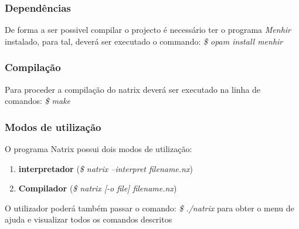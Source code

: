 \subsubsection{Dependências}
\label{sec2:subsubsec:dependencias}

De forma a ser possivel compilar o projecto é necessário ter o programa \textit{Menhir} instalado, para tal, deverá ser executado o commando: \textit{\$ opam install menhir}

\subsubsection{Compilação}
\label{sec2:subsubsec:compilacao}

Para proceder a compilação do natrix deverá ser executado na linha de comandos: \textit{\$ make}

\subsubsection{Modos de utilização}
\label{sec2:subsubsec:utilizacao}

O programa Natrix possui dois modos de utilização:

\begin{enumerate}
  \item \textbf{interpretador} (\textit{\$ natrix --interpret filename.nx})
  \item \textbf{Compilador} (\textit{\$ natrix [-o file] filename.nx})
\end{enumerate}

O utilizador poderá também passar o comando: \textit{\$ ./natrix} para obter o menu de ajuda e visualizar todos os comandos descritos
